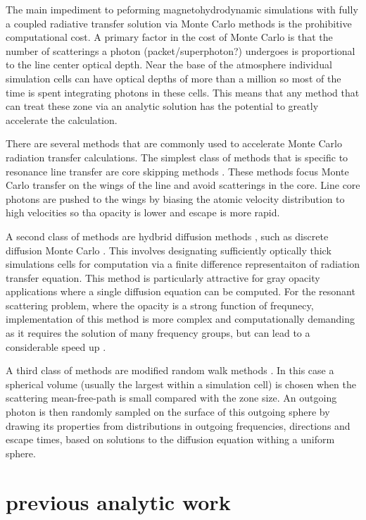 \documentclass{aastex63}
\begin{document}
The main impediment to peforming magnetohydrodynamic simulations with fully a coupled radiative transfer solution via Monte Carlo methods is the prohibitive computational cost. A primary factor in the cost of Monte Carlo is that the number of scatterings a photon (packet/superphoton?) undergoes is proportional to the line center optical depth.  Near the base of the atmosphere individual simulation cells can have optical depths of more than a million so most of the time is spent integrating photons in these cells. This means that any method that can treat these zone via an analytic solution has the potential to greatly accelerate the calculation.

There are several methods that are commonly used to accelerate Monte Carlo radiation transfer calculations.  The simplest class of methods that is specific to resonance line transfer are core skipping methods \citep{1968ApJ...153..783A,2002ApJ...567..922A}.  These methods focus Monte Carlo transfer on the wings of the line and avoid scatterings in the core. Line core photons are pushed to the wings by biasing the atomic velocity distribution to high velocities so tha opacity is lower and escape is more rapid.

A second class of methods are hydbrid diffusion methods \citep{2001JCoPh.172..543G}, such as discrete diffusion Monte Carlo \citep{2007JCoPh.222..485D}. This involves designating sufficiently optically thick simulations cells for computation via a finite difference representaiton of radiation transfer equation. This method is particularly attractive for gray opacity applications where a single diffusion equation can be computed.  For the resonant scattering problem, where the opacity is a strong function of frequnecy, implementation of this method is more complex and computationally demanding as it requires the solution of many frequency groups, but can lead to a considerable speed up \citep{2018MNRAS.479.2065S}.

A third class of methods are modified random walk methods \citep{1984JCoPh..54..508F,2009A&A...497..155M,Robitaille2010}. In this case a spherical volume (usually the largest within a simulation cell) is chosen when the scattering mean-free-path is small compared with the zone size.  An outgoing photon is then randomly sampled on the surface of this outgoing sphere by drawing its properties from distributions in outgoing frequencies, directions and escape times, based on solutions to the diffusion equation withing a uniform sphere. 

\section{ previous analytic work }
\end{document}

